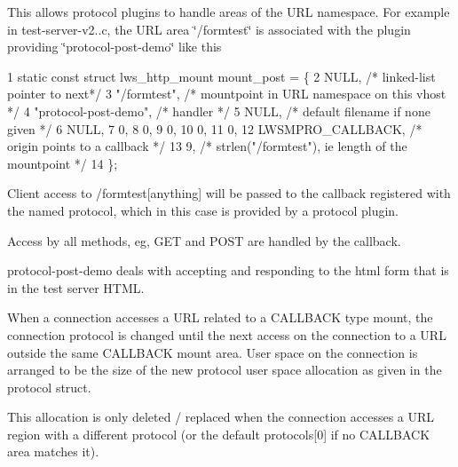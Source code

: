 This allows protocol plugins to handle areas of the U\+RL namespace. For example in test-\/server-\/v2..\+c, the U\+RL area \char`\"{}/formtest\char`\"{} is associated with the plugin providing \char`\"{}protocol-\/post-\/demo\char`\"{} like this


\begin{DoxyCode}
1 static const struct lws\_http\_mount mount\_post = \{
2         NULL,           /* linked-list pointer to next*/
3         "/formtest",            /* mountpoint in URL namespace on this vhost */
4         "protocol-post-demo",   /* handler */
5         NULL,   /* default filename if none given */
6         NULL,
7         0,
8         0,
9         0,
10         0,
11         0,
12         LWSMPRO\_CALLBACK,       /* origin points to a callback */
13         9,                      /* strlen("/formtest"), ie length of the mountpoint */
14 \};
\end{DoxyCode}


Client access to /formtest\mbox{[}anything\mbox{]} will be passed to the callback registered with the named protocol, which in this case is provided by a protocol plugin.

Access by all methods, eg, G\+ET and P\+O\+ST are handled by the callback.

protocol-\/post-\/demo deals with accepting and responding to the html form that is in the test server H\+T\+ML.

When a connection accesses a U\+RL related to a C\+A\+L\+L\+B\+A\+CK type mount, the connection protocol is changed until the next access on the connection to a U\+RL outside the same C\+A\+L\+L\+B\+A\+CK mount area. User space on the connection is arranged to be the size of the new protocol user space allocation as given in the protocol struct.

This allocation is only deleted / replaced when the connection accesses a U\+RL region with a different protocol (or the default protocols\mbox{[}0\mbox{]} if no C\+A\+L\+L\+B\+A\+CK area matches it). 